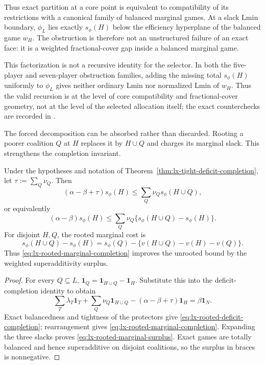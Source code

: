 Thus exact partition at a core point is equivalent to compatibility of its
restrictions with a canonical family of balanced marginal games.  At a slack
Lmin boundary, $\phi_L$ lies exactly $s_\phi(H)$ below the efficiency
hyperplane of the balanced game $w_H$.  The obstruction is therefore not an
unstructured failure of an exact face: it is a weighted fractional-cover gap
inside a balanced marginal game.

This factorization is not a recursive identity for the selector.  In both
the five-player and seven-player obstruction families, adding the missing
total $s_\phi(H)$ uniformly to $\phi_L$ gives neither ordinary Lmin nor
normalized Lmin of $w_H$.  Thus the valid recursion is at the level of core
compatibility and fractional-cover geometry, not at the level of the selected
allocation itself; the exact counterchecks are recorded in
.

The forced decomposition can be absorbed rather than discarded.  Rooting a
poorer coalition $Q$ at $H$ replaces it by $H\cup Q$ and charges its marginal
slack.  This strengthens the completion invariant.

\begin{theorem}
\label{thm:lx-rooted-deficit-completion}
Under the hypotheses and notation of
Theorem~\ref{thm:lx-tight-deficit-completion}, let
$\tau:=\sum_Q\nu_Q$.  Then
\[
 (\alpha-\beta+\tau)s_\phi(H)
 \leq\sum_Q\nu_Qs_\phi(H\cup Q),                   \tag{RDC}
 \label{eq:lx-rooted-deficit-completion}
\]
or equivalently
\[
 (\alpha-\beta)s_\phi(H)
 \leq\sum_Q\nu_Q\{s_\phi(H\cup Q)-s_\phi(H)\}.
                                                               \tag{RMC}
 \label{eq:lx-rooted-marginal-completion}
\]
For disjoint $H,Q$, the rooted marginal cost is
\[
 s_\phi(H\cup Q)-s_\phi(H)
 =s_\phi(Q)-\{v(H\cup Q)-v(H)-v(Q)\}.              \tag{RMS}
 \label{eq:lx-rooted-marginal-surplus}
\]
Thus \eqref{eq:lx-rooted-marginal-completion} improves the unrooted bound by
the weighted superadditivity surplus.
\end{theorem}

\begin{proof}
For every $Q\subseteq L$,
$\mathbf1_Q=\mathbf1_{H\cup Q}-\mathbf1_H$.  Substitute this into the
deficit-completion identity to obtain
\[
 \sum_T\lambda_T\mathbf1_T+\sum_Q\nu_Q\mathbf1_{H\cup Q}
 -(\alpha-\beta+\tau)\mathbf1_H=\beta\mathbf1_N.
\]
Exact balancedness and tightness of the protectors give
\eqref{eq:lx-rooted-deficit-completion}; rearrangement gives
\eqref{eq:lx-rooted-marginal-completion}.  Expanding the three slacks proves
\eqref{eq:lx-rooted-marginal-surplus}.  Exact games are totally balanced and
hence superadditive on disjoint coalitions, so the surplus in braces is
nonnegative.
\end{proof}

